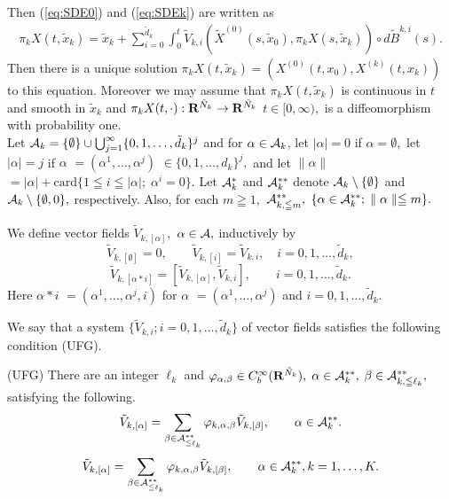 \documentclass[12pt]{article}
\begin{document}
Then (\ref{eq:SDE0}) and (\ref{eq:SDEk}) are written as 
\begin{align}
\pi_k{X}(t,\tilde{x}_k) = \tilde{x}_k + \sum_{i=0}^{\tilde{d}_k} \int_{0}^{t} \tilde{V}_{k, i}(\tilde{X}^{(0)}(s,\tilde{x}_0), \pi_k{X}(s,\tilde{x}_k))\circ d\tilde{B}^{k, i}(s).
\end{align}
Then there is a unique solution $\pi_k{X}(t,\tilde{x}_k)=({X}^{(0)}(t,{x}_0), {X}^{(k)}(t,{x}_k) )$ 
to this equation. Moreover we may assume that  $\pi_k{X}(t,\tilde{x}_k)$ 
is continuous in $t$ and smooth in $\tilde{x}_k$ 
and $\pi_k{X}(t,\cdot ):{\bf R}^{\tilde{N}_k}\to {\bf R}^{\tilde{N}_k}$ $t \in [0,\infty ),$
is a diffeomorphism with probability one.
\\

Let ${\cal A}_{k} =  \{ \emptyset \} \cup 
\bigcup_{j = 1}^{\infty} \{ 0,1,\ldots , \tilde{d}_k \}^j $ 
and for $\alpha \in {\cal A}_k$, 
let $|\alpha | = 0$  if  $\alpha = \emptyset ,$ 
let $|\alpha | = j$ if 
$\alpha $ $= (\alpha^1,\ldots ,\alpha^j)$
$\in \{ 0,1,\ldots , d_k \}^j ,$ and 
let $ \parallel \alpha \parallel $ 
$ = |\alpha | + \mbox{card}\{ 1 \leqq i \leqq |\alpha | ; 
\; \alpha^i = 0 \}.$ 
Let ${\cal A}_k^{*}$ and ${\cal A}_k^{**}$ denote 
${\cal A}_k\setminus \{ \emptyset \} $ and
${\cal A}_k\setminus \{ \emptyset , 0 \},$ respectively.
Also, for each $m\geqq 1,$ ${\cal A}^{**}_{k, \leqq m},$  
$\{ \alpha \in {\cal A}^{**}_k; \; \parallel \alpha \parallel \leqq m \} .$

We define vector fields $\tilde{V}_{k,[\alpha ]},$ $\alpha \in {\cal A},$ 
inductively by
$$
\tilde{V}_{k, [\emptyset ]} = 0, 
\qquad \tilde{V}_{k, [i]} = \tilde{V}_{k,i}, 
\quad i = 0,1,\ldots ,\tilde{d}_k,
$$
$$
\tilde{V}_{k, [\alpha *i]} = [\tilde{V}_{k, [\alpha ]},\tilde{V}_{k,i}], 
\qquad i = 0,1,\ldots ,\tilde{d}_k.
$$
Here $\alpha *i$ 
$= (\alpha^1,\ldots ,\alpha^j,i)$
for $\alpha $ $= (\alpha^1,\ldots ,\alpha^j)$ and $i = 0,1,\ldots ,\tilde{d}_k.$

We say that a system $\{ \tilde{V}_{k,i} ; i=0,1,\ldots ,\tilde{d}_k \}$ of vector fields 
satisfies the following condition (UFG).

\noindent
(UFG) There are an integer $\ell_k$ 
and $\varphi_{\alpha,\beta} \in C^{\infty}_b({\bf R}^{\tilde{N}_k}),$ 
$\alpha \in {\cal A}_k^{**},$ $\beta \in {\cal A}^{**}_{k, \leqq \ell_k},$ 
satisfying the following.
$$
{\displaystyle \tilde{V}_{k,[\alpha ]} 
= \sum_{\beta \in {\cal A}^{**}_{\leqq \ell_k}}
\varphi_{k, \alpha,\beta}\tilde{V}_{k,[\beta ]}},
\qquad 
\alpha \in {\cal A}_k^{**}.
$$
$$
{\displaystyle \tilde{V}_{k,[\alpha ]} 
= \sum_{\beta \in {\cal A}^{**}_{\leqq \ell_k}}
\varphi_{k, \alpha,\beta}\tilde{V}_{k,[\beta ]}},
\qquad 
\alpha \in {\cal A}_k^{**}, k=1,\ldots,K.
$$
\end{document}

